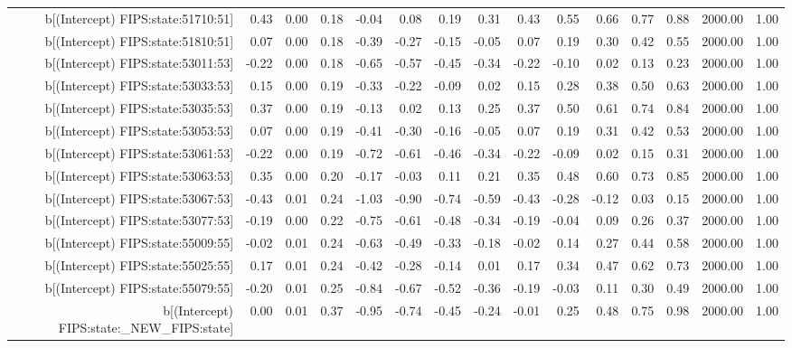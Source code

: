 \begin{table}[ht]
\begin{tabular}{rrrrrrrrrrrrrrr}
  b[(Intercept) FIPS:state:51710:51] & 0.43 & 0.00 & 0.18 & -0.04 & 0.08 & 0.19 & 0.31 & 0.43 & 0.55 & 0.66 & 0.77 & 0.88 & 2000.00 & 1.00 \\ 
  b[(Intercept) FIPS:state:51810:51] & 0.07 & 0.00 & 0.18 & -0.39 & -0.27 & -0.15 & -0.05 & 0.07 & 0.19 & 0.30 & 0.42 & 0.55 & 2000.00 & 1.00 \\ 
  b[(Intercept) FIPS:state:53011:53] & -0.22 & 0.00 & 0.18 & -0.65 & -0.57 & -0.45 & -0.34 & -0.22 & -0.10 & 0.02 & 0.13 & 0.23 & 2000.00 & 1.00 \\ 
  b[(Intercept) FIPS:state:53033:53] & 0.15 & 0.00 & 0.19 & -0.33 & -0.22 & -0.09 & 0.02 & 0.15 & 0.28 & 0.38 & 0.50 & 0.63 & 2000.00 & 1.00 \\ 
  b[(Intercept) FIPS:state:53035:53] & 0.37 & 0.00 & 0.19 & -0.13 & 0.02 & 0.13 & 0.25 & 0.37 & 0.50 & 0.61 & 0.74 & 0.84 & 2000.00 & 1.00 \\ 
  b[(Intercept) FIPS:state:53053:53] & 0.07 & 0.00 & 0.19 & -0.41 & -0.30 & -0.16 & -0.05 & 0.07 & 0.19 & 0.31 & 0.42 & 0.53 & 2000.00 & 1.00 \\ 
  b[(Intercept) FIPS:state:53061:53] & -0.22 & 0.00 & 0.19 & -0.72 & -0.61 & -0.46 & -0.34 & -0.22 & -0.09 & 0.02 & 0.15 & 0.31 & 2000.00 & 1.00 \\ 
  b[(Intercept) FIPS:state:53063:53] & 0.35 & 0.00 & 0.20 & -0.17 & -0.03 & 0.11 & 0.21 & 0.35 & 0.48 & 0.60 & 0.73 & 0.85 & 2000.00 & 1.00 \\ 
  b[(Intercept) FIPS:state:53067:53] & -0.43 & 0.01 & 0.24 & -1.03 & -0.90 & -0.74 & -0.59 & -0.43 & -0.28 & -0.12 & 0.03 & 0.15 & 2000.00 & 1.00 \\ 
  b[(Intercept) FIPS:state:53077:53] & -0.19 & 0.00 & 0.22 & -0.75 & -0.61 & -0.48 & -0.34 & -0.19 & -0.04 & 0.09 & 0.26 & 0.37 & 2000.00 & 1.00 \\ 
  b[(Intercept) FIPS:state:55009:55] & -0.02 & 0.01 & 0.24 & -0.63 & -0.49 & -0.33 & -0.18 & -0.02 & 0.14 & 0.27 & 0.44 & 0.58 & 2000.00 & 1.00 \\ 
  b[(Intercept) FIPS:state:55025:55] & 0.17 & 0.01 & 0.24 & -0.42 & -0.28 & -0.14 & 0.01 & 0.17 & 0.34 & 0.47 & 0.62 & 0.73 & 2000.00 & 1.00 \\ 
  b[(Intercept) FIPS:state:55079:55] & -0.20 & 0.01 & 0.25 & -0.84 & -0.67 & -0.52 & -0.36 & -0.19 & -0.03 & 0.11 & 0.30 & 0.49 & 2000.00 & 1.00 \\ 
  b[(Intercept) FIPS:state:\_NEW\_FIPS:state] & 0.00 & 0.01 & 0.37 & -0.95 & -0.74 & -0.45 & -0.24 & -0.01 & 0.25 & 0.48 & 0.75 & 0.98 & 2000.00 & 1.00 \\ 

\end{tabular}
\end{table}
